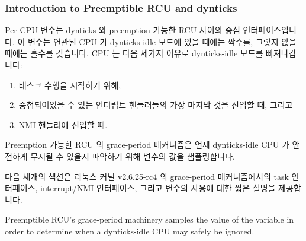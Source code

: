 \fi

\subsubsection{Introduction to Preemptible RCU and dynticks}
\label{sec:formal:Introduction to Preemptible RCU and dynticks}

Per-CPU  변수는 dynticks 와 preemption 가능한 RCU
사이의 중심 인터페이스입니다.
이 변수는 연관된 CPU 가 dynticks-idle 모드에 있을 때에는 짝수를, 그렇지 않을
때에는 홀수를 갖습니다.
CPU 는 다음 세가지 이유로 dynticks-idle 모드를 빠져나갑니다:

\iffalse

The per-CPU \co{dynticks_progress_counter} variable is
central to the interface between dynticks and preemptible RCU\@.
This variable has an even value whenever the corresponding CPU
is in dynticks-idle mode, and an odd value otherwise.
A CPU exits dynticks-idle mode for the following three reasons:

\fi

\begin{enumerate}
\item	태스크 수행을 시작하기 위해,
\item	중첩되어있을 수 있는 인터럽트 핸들러들의 가장 마지막 것을 진입할 때,
	그리고
\item	NMI 핸들러에 진입할 때.

\iffalse

\item	To start running a task,
\item	When entering the outermost of a possibly nested set of interrupt
	handlers, and
\item	When entering an NMI handler.

\fi

\end{enumerate}

Preemption 가능한 RCU 의 grace-period 메커니즘은 언제 dynticks-idle CPU 가
안전하게 무시될 수 있을지 파악하기 위해  변수의
값을 샘플링합니다.

다음 세개의 섹션은 리눅스 커널 v2.6.25-rc4 의 grace-period 메커니즘에서의 task
인터페이스, interrupt/NMI 인터페이스, 그리고 
변수의 사용에 대한 짧은 설명을 제공합니다.

\iffalse

Preemptible RCU's grace-period machinery samples the value of
the  variable in order to
determine when a dynticks-idle CPU may safely be ignored.

